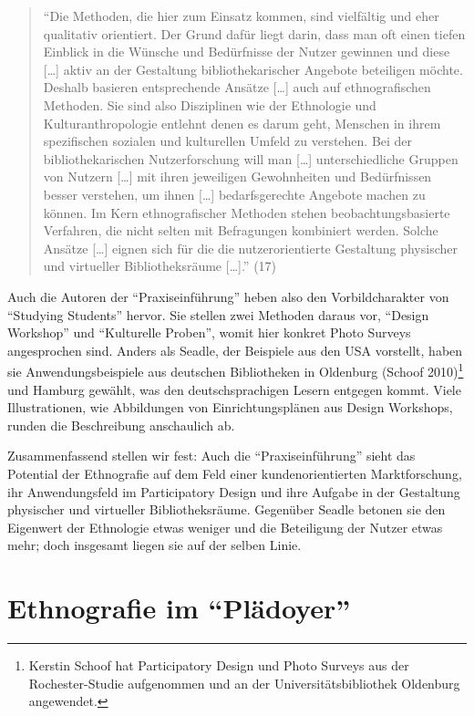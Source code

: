\documentclass[a4paper,
fontsize=11pt,
oneside,
numbers=noperiodatend,
parskip=half-,
bibliography=totoc,
final
]{scrartcl}
\begin{document}
\begin{quote}
\enquote{Die Methoden, die hier zum Einsatz kommen, sind vielfältig und
eher qualitativ orientiert. Der Grund dafür liegt darin, dass man oft
einen tiefen Einblick in die Wünsche und Bedürfnisse der Nutzer gewinnen
und diese {[}\ldots{}{]} aktiv an der Gestaltung bibliothekarischer
Angebote beteiligen möchte. Deshalb basieren entsprechende Ansätze
{[}\ldots{}{]} auch auf ethnografischen Methoden. Sie sind also
Disziplinen wie der Ethnologie und Kulturanthropologie entlehnt denen es
darum geht, Menschen in ihrem spezifischen sozialen und kulturellen
Umfeld zu verstehen. Bei der bibliothekarischen Nutzerforschung will man
{[}\ldots{}{]} unterschiedliche Gruppen von Nutzern {[}\ldots{}{]} mit
ihren jeweiligen Gewohnheiten und Bedürfnissen besser verstehen, um
ihnen {[}\ldots{}{]} bedarfsgerechte Angebote machen zu können. Im Kern
ethnografischer Methoden stehen beobachtungsbasierte Verfahren, die
nicht selten mit Befragungen kombiniert werden. Solche Ansätze
{[}\ldots{}{]} eignen sich für die die nutzerorientierte Gestaltung
physischer und virtueller Bibliotheksräume {[}\ldots{}{]}.} (17)
\end{quote}

Auch die Autoren der \enquote{Praxiseinführung} heben also den
Vorbildcharakter von \enquote{Studying Students} hervor. Sie stellen
zwei Methoden daraus vor, \enquote{Design Workshop} und
\enquote{Kulturelle Proben}, womit hier konkret Photo Surveys
angesprochen sind. Anders als Seadle, der Beispiele aus den USA
vorstellt, haben sie Anwendungsbeispiele aus deutschen Bibliotheken in
Oldenburg (Schoof 2010)\footnote{Kerstin Schoof hat Participatory Design
  und Photo Surveys aus der Rochester-Studie aufgenommen und an der
  Universitätsbibliothek Oldenburg angewendet.} und Hamburg gewählt, was
den deutschsprachigen Lesern entgegen kommt. Viele Illustrationen, wie
Abbildungen von Einrichtungsplänen aus Design Workshops, runden die
Beschreibung anschaulich ab.

Zusammenfassend stellen wir fest: Auch die \enquote{Praxiseinführung}
sieht das Potential der Ethnografie auf dem Feld einer
kundenorientierten Marktforschung, ihr Anwendungsfeld im Participatory
Design und ihre Aufgabe in der Gestaltung physischer und virtueller
Bibliotheksräume. Gegenüber Seadle betonen sie den Eigenwert der
Ethnologie etwas weniger und die Beteiligung der Nutzer etwas mehr; doch
insgesamt liegen sie auf der selben Linie.

\section*{Ethnografie im
\enquote{Plädoyer}}\label{ethnografie-im-pluxe4doyer}
\end{document}
